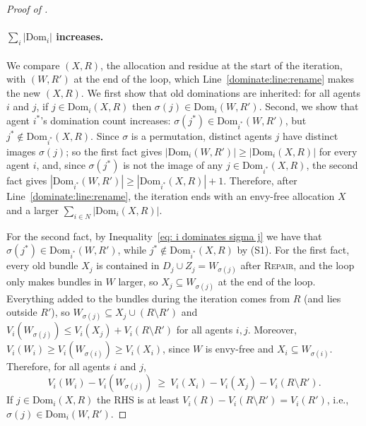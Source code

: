 \documentclass[11pt]{article}
\newcommand{\Repair}{\textsc{Repair}}
\newcommand{\Dom}{\mathrm{Dom}}
\theoremstyle{plain}
\theoremstyle{definition}
\theoremstyle{plain}
\begin{document}
\begin{proof}[Proof of ]
\paragraph{$\sum_i |\Dom_i|$ increases.}
We compare $(X,R)$, the allocation and residue at the start of the iteration, with $(W,R')$ at the end of the loop, which Line~\ref{dominate:line:rename} makes the new $(X,R)$. We first show that old dominations are inherited: for all agents $i$ and $j$, if $j\in\Dom_i(X,R)$ then $\sigma(j)\in\Dom_i(W,R')$. Second, we show that agent $i^*$'s domination count increases: $\sigma(j^*)\in\Dom_{i^*}(W,R')$, but $j^* \notin \Dom_{i^*}(X,R)$. Since $\sigma$ is a permutation, distinct agents $j$ have distinct images $\sigma(j)$; so the first fact gives $|\Dom_i(W,R')|\ge|\Dom_i(X,R)|$ for every agent $i$, and, since $\sigma(j^*)$ is not the image of any $j\in\Dom_{i^*}(X,R)$, the second fact gives $|\Dom_{i^*}(W,R')|\ge|\Dom_{i^*}(X,R)|+1$. Therefore, after Line~\ref{dominate:line:rename}, the iteration ends with an envy-free allocation $X$ and a larger $\sum_{i\in N}|\Dom_i(X,R)|$.

For the second fact, by Inequality~\eqref{eq: i dominates sigma j} we have that $\sigma(j^*)\in\Dom_{i^*}(W,R')$, while $j^*\notin\Dom_{i^*}(X,R)$ by (S1).
For the first fact, every old bundle $X_j$ is contained in $D_j\cup Z_j = W_{\sigma(j)}$ after \Repair{}, and the loop only makes bundles in $W$ larger, so $X_j\subseteq W_{\sigma(j)}$ at the end of the loop. Everything added to the bundles during the iteration comes from $R$ (and lies outside $R'$), so $W_{\sigma(j)}\subseteq X_j\cup(R\setminus R')$ and $V_i(W_{\sigma(j)})\le V_i(X_j)+V_i(R\setminus R')$ for all agents $i,j$. Moreover, $V_i(W_i)\ge V_i(W_{\sigma(i)})\ge V_i(X_i)$, since $W$ is envy-free and $X_i\subseteq W_{\sigma(i)}$. Therefore, for all agents $i$ and $j$,
\[
V_i(W_i)-V_i(W_{\sigma(j)})\ \ge\ V_i(X_i)-V_i(X_j)-V_i(R\setminus R').
\]
If $j\in\Dom_i(X,R)$ the RHS is at least $V_i(R)-V_i(R\setminus R')=V_i(R')$, i.e., $\sigma(j)\in\Dom_i(W,R')$. 




\end{proof}
\end{document}
